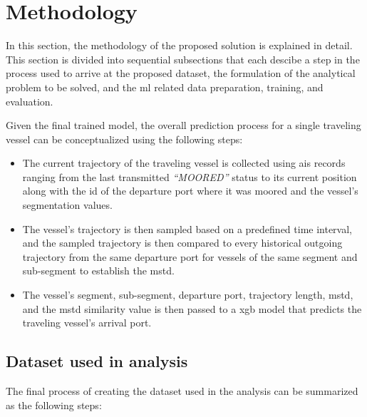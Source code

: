 \chapter{Methodology}

In this section, the methodology of the proposed solution is explained in detail. This section is divided into sequential subsections that each descibe a step in the process used to arrive at the proposed dataset, the formulation of the analytical problem to be solved, and the \acrfull{ml} related data preparation, training, and evaluation.

Given the final trained model, the overall prediction process for a single traveling vessel can be conceptualized using the following steps:

\begin{itemize}
    \item The current trajectory of the traveling vessel is collected using \acrshort{ais} records ranging from the last transmitted \textit{``MOORED''} status to its current position along with the id of the departure port where it was moored and the vessel's segmentation values.
    \item The vessel's trajectory is then sampled based on a predefined time interval, and the sampled trajectory is then compared to every historical outgoing trajectory from the same departure port for vessels of the same segment and sub-segment to establish the \acrfull{mstd}.
    \item The vessel's segment, sub-segment, departure port, trajectory length, \acrshort{mstd}, and the \acrshort{mstd} similarity value is then passed to a \acrshort{xgb} model that predicts the traveling vessel's arrival port.
\end{itemize}


\section{Dataset used in analysis}

The final process of creating the dataset used in the analysis can be summarized as the following steps:

